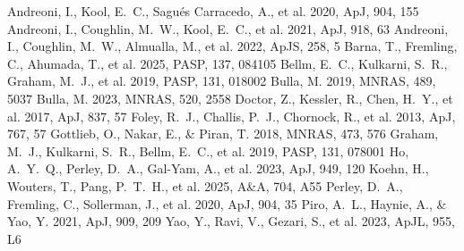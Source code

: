 \documentclass[twocolumn]{aastex631}
\begin{document}
\begin{thebibliography}{}
 Andreoni, I., Kool, E.~C., Sagu{\'e}s Carracedo, A., et al. 2020, ApJ, 904, 155
 Andreoni, I., Coughlin, M.~W., Kool, E.~C., et al. 2021, ApJ, 918, 63
 Andreoni, I., Coughlin, M.~W., Almualla, M., et al. 2022, ApJS, 258, 5
 Barna, T., Fremling, C., Ahumada, T., et al. 2025, PASP, 137, 084105
 Bellm, E.~C., Kulkarni, S.~R., Graham, M.~J., et al. 2019, PASP, 131, 018002
 Bulla, M. 2019, MNRAS, 489, 5037
 Bulla, M. 2023, MNRAS, 520, 2558
 Doctor, Z., Kessler, R., Chen, H.~Y., et al. 2017, ApJ, 837, 57
 Foley, R.~J., Challis, P.~J., Chornock, R., et al. 2013, ApJ, 767, 57
 Gottlieb, O., Nakar, E., \& Piran, T. 2018, MNRAS, 473, 576
 Graham, M.~J., Kulkarni, S.~R., Bellm, E.~C., et al. 2019, PASP, 131, 078001
 Ho, A.~Y.~Q., Perley, D.~A., Gal-Yam, A., et al. 2023, ApJ, 949, 120
 Koehn, H., Wouters, T., Pang, P.~T.~H., et al. 2025, A\&A, 704, A55
 Perley, D.~A., Fremling, C., Sollerman, J., et al. 2020, ApJ, 904, 35
 Piro, A.~L., Haynie, A., \& Yao, Y. 2021, ApJ, 909, 209
 Yao, Y., Ravi, V., Gezari, S., et al. 2023, ApJL, 955, L6
\end{thebibliography}
\end{document}
